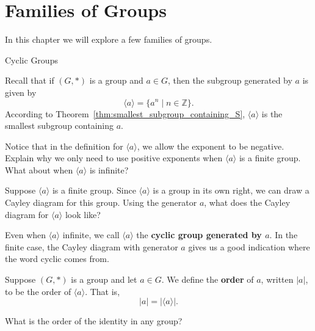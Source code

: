 \chapter{Families of Groups}
\label{chapter:families}
\thispagestyle{empty}

In this chapter we will explore a few families of groups.

\begin{section}{Cyclic Groups}

Recall that if $(G,*)$ is a group and $a\in G$, then the subgroup generated by $a$ is given by
\[
\langle a\rangle =\{a^n\mid n\in\mathbb{Z}\}.
\]
According to Theorem~\ref{thm:smallest_subgroup_containing_S}, $\langle a\rangle$ is the smallest subgroup containing $a$.  

\begin{exercise}\label{exer:finite_pos_exps}
Notice that in the definition for $\langle a\rangle$, we allow the exponent to be negative.  Explain why we only need to use positive exponents when $\langle a\rangle$ is a finite group.  What about when $\langle a\rangle$ is infinite?
\end{exercise}

\begin{exercise}
Suppose $\langle a\rangle$ is a finite group.  Since $\langle a\rangle$ is a group in its own right, we can draw a Cayley diagram for this group.  Using the generator $a$, what does the Cayley diagram for $\langle a\rangle$ look like?
\end{exercise}

Even when $\langle a\rangle$ infinite, we call $\langle a\rangle$ the \textbf{cyclic group generated by $a$}.  In the finite case, the Cayley diagram with generator $a$ gives us a good indication where the word cyclic comes from.

\begin{definition}
Suppose $(G,*)$ is a group and let $a\in G$.  We define the \textbf{order} of $a$, written $|a|$, to be the order of $\langle a\rangle$.  That is,
\[
|a|=|\langle a\rangle|.
\]
\end{definition}

\begin{exercise}
What is the order of the identity in any group?
\end{exercise}


\end{section}
